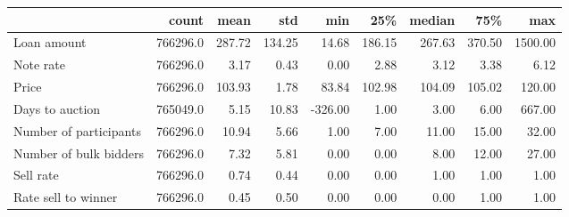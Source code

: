 \begin{tabular}{lrrrrrrrr}
\toprule
{} &     count &    mean &     std &     min &     25\% &  median &     75\% &      max \\
\midrule
Loan amount            &  766296.0 &  287.72 &  134.25 &   14.68 &  186.15 &  267.63 &  370.50 &  1500.00 \\
Note rate              &  766296.0 &    3.17 &    0.43 &    0.00 &    2.88 &    3.12 &    3.38 &     6.12 \\
Price                  &  766296.0 &  103.93 &    1.78 &   83.84 &  102.98 &  104.09 &  105.02 &   120.00 \\
Days to auction        &  765049.0 &    5.15 &   10.83 & -326.00 &    1.00 &    3.00 &    6.00 &   667.00 \\
Number of participants &  766296.0 &   10.94 &    5.66 &    1.00 &    7.00 &   11.00 &   15.00 &    32.00 \\
Number of bulk bidders &  766296.0 &    7.32 &    5.81 &    0.00 &    0.00 &    8.00 &   12.00 &    27.00 \\
Sell rate              &  766296.0 &    0.74 &    0.44 &    0.00 &    0.00 &    1.00 &    1.00 &     1.00 \\
Rate sell to winner    &  766296.0 &    0.45 &    0.50 &    0.00 &    0.00 &    0.00 &    1.00 &     1.00 \\
\bottomrule
\end{tabular}
